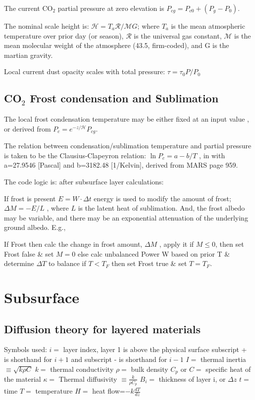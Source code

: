 \documentclass{article}
\def\qH{\mathcal{H}} %
\begin{document}
The current CO$_2$ partial pressure at zero elevation is $P_{cg}=P_{c0} +
(P_g-P_0)$.  

The nominal scale height is: $\qH=T_a \mathcal{R} / \mathcal{M} G $;
where $T_a$ is the mean atmospheric temperature over
prior day (or season), $\mathcal{R}$ is the
universal gas constant, $\mathcal{M}$ is the mean molecular weight of
the atmosphere (43.5, firm-coded), and G is the martian gravity.

Local current dust opacity scales with total pressure: $ \tau = \tau_0 P/P_0$

\subsection {CO$_2$ Frost condensation and Sublimation \label{sec:frost}} %

The local frost condensation temperature  may be either fixed at an
input value , or derived from $P_c= e^{-z/\qH} P_{cg}$.

The relation between condensation/sublimation temperature and partial pressure
is taken to be the Clausius-Clapeyron relation: $ \ln P_c=a-b/T$ , in
 with a=27.9546 [Pascal] and b=3182.48 [1/Kelvin], derived from
MARS page 959.

The code logic is: after subsurface layer calculations:

If frost is present $E=W \cdot \Delta t$ energy is used to modify the amount of
frost; $\Delta M = -E/L$ , where $L$ is the latent heat of sublimation. And, the
frost albedo may be variable, and there may be an exponential attenuation of the
underlying ground albedo. E.g.,

If Frost then
\qi calc the change in frost amount, $\Delta M$ , apply it
\qii if $M \le 0$, then
\qiii set Frost false \& set $M=0$
\qi else
\qii calc unbalanced Power W based on prior T \& determine $\Delta T$ to balance
\qiii if $T < T_F$ then
\qiii set Frost true \& set $T=T_F$.

\section {Subsurface}  %
\subsection{Diffusion theory for layered materials} %
Symbols used:
\qi $i=$ layer index, layer 1 is above the physical surface
\qii subscript + is shorthand for $i+1$ and subscript - is shorthand for $i-1$
\qi $I=$ thermal inertia $\equiv \sqrt{k \rho C}$
\qi $k=$ thermal conductivity
\qi $\rho=$ bulk density
\qi $C_p$ or $C=$ specific heat of the material
\qi$\kappa =$  Thermal diffusivity $ \equiv \frac{k}{\rho C_p}$
\qi $B_i=$ thickness of layer i, or $\Delta z$
\qi $t=$ time
\qi $T=$ temperature
\qi $H=$ heat flow=$-k \frac{dT}{dz}$
\end{document}
